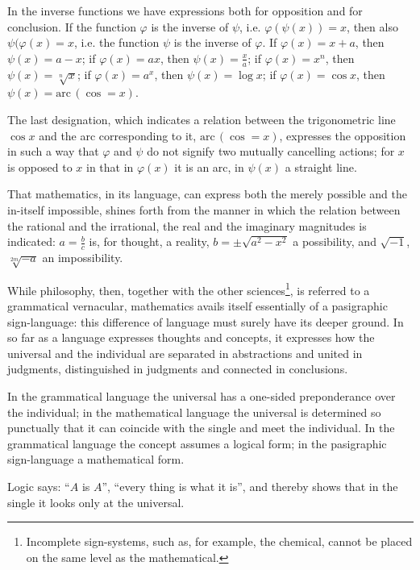 \documentclass[12pt]{book}
\begin{document}
In the inverse functions we have expressions both for opposition and for
conclusion. If the function $\varphi$ is the inverse of $\psi$, i.e.
$\varphi(\psi(x)) = x$, then also $\psi(\varphi(x) = x$, i.e. the function
$\psi$ is the inverse of $\varphi$. If $\varphi(x) = x+a$, then $\psi(x) = a-x$;
if $\varphi(x) = ax$, then $\psi(x) = \frac{x}{a}$; if $\varphi(x) = x^{n}$, then
$\psi(x) = \sqrt[n]{x}$; if $\varphi(x) = a^{x}$, then $\psi(x) = \log x$; if
$\varphi(x) = \cos x$, then $\psi(x) = \mathrm{arc}\,(\cos = x)$.

The last designation, which indicates a relation between the trigonometric line
$\cos x$ and the arc corresponding to it, $\mathrm{arc}\,(\cos = x)$, expresses
the opposition in such a way that $\varphi$ and $\psi$ do not signify two
mutually cancelling actions; for $x$ is opposed to $x$ in that in $\varphi(x)$ it
is an arc, in $\psi(x)$ a straight line.

That mathematics, in its language, can express both the merely possible and the
in-itself impossible, shines forth from the manner in which the relation between
the rational and the irrational, the real and the imaginary magnitudes is
indicated: $a = \frac{b}{c}$ is, for thought, a reality, $b = \pm\sqrt{a^{2}-x^{2}}$
a possibility, and $\sqrt{-1}$, $\sqrt[2m]{-a}$ an impossibility.

While philosophy, then, together with the other sciences\footnote{Incomplete
sign-systems, such as, for example, the chemical, cannot be placed on the same
level as the mathematical.}, is referred to a grammatical vernacular,
mathematics avails itself essentially of a pasigraphic sign-language: this
difference of language must surely have its deeper ground.
In so far as a language expresses thoughts and concepts, it expresses how the
universal and the individual are separated in abstractions and united in
judgments, distinguished in judgments and connected in conclusions.

In the grammatical language the universal has a one-sided preponderance over the
individual; in the mathematical language the universal is determined so
punctually that it can coincide with the single and meet the individual. In the
grammatical language the concept assumes a logical form; in the pasigraphic
sign-language a mathematical form.

Logic says: ``$A$ is $A$'', ``every thing is what it is'', and thereby shows that
in the single it looks only at the universal.
\end{document}

